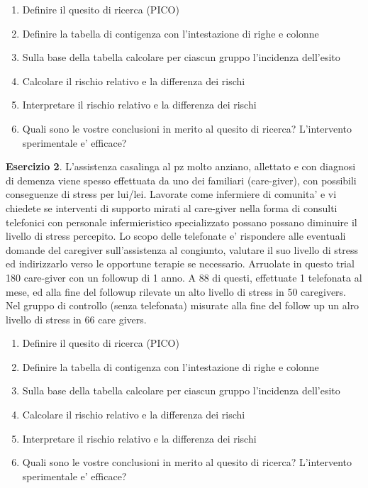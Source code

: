 \documentclass[]{book}
\begin{document}
\begin{enumerate}
\def\labelenumi{\arabic{enumi})}
\item
  Definire il quesito di ricerca (PICO)
\item
  Definire la tabella di contigenza con l'intestazione di righe e colonne
\item
  Sulla base della tabella calcolare per ciascun gruppo l'incidenza dell'esito
\item
  Calcolare il rischio relativo e la differenza dei rischi
\item
  Interpretare il rischio relativo e la differenza dei rischi
\item
  Quali sono le vostre conclusioni in merito al quesito di ricerca? L'intervento sperimentale e' efficace?
\end{enumerate}

\textbf{Esercizio 2}. L'assistenza casalinga al pz molto anziano, allettato e con diagnosi di demenza viene spesso effettuata da uno dei familiari (care-giver), con possibili conseguenze di stress per lui/lei. Lavorate come infermiere di comunita' e vi chiedete se interventi di supporto mirati al care-giver nella forma di consulti telefonici con personale infermieristico specializzato possano possano diminuire il livello di stress percepito. Lo scopo delle telefonate e' rispondere alle eventuali domande del caregiver sull'assistenza al congiunto, valutare il suo livello di stress ed indirizzarlo verso le opportune terapie se necessario. Arruolate in questo trial 180 care-giver con un followup di 1 anno. A 88 di questi, effettuate 1 telefonata al mese, ed alla fine del followup rilevate un alto livello di stress in 50 caregivers. Nel gruppo di controllo (senza telefonata) misurate alla fine del follow up un alro livello di stress in 66 care givers.

\begin{enumerate}
\def\labelenumi{\arabic{enumi})}
\item
  Definire il quesito di ricerca (PICO)
\item
  Definire la tabella di contigenza con l'intestazione di righe e colonne
\item
  Sulla base della tabella calcolare per ciascun gruppo l'incidenza dell'esito
\item
  Calcolare il rischio relativo e la differenza dei rischi
\item
  Interpretare il rischio relativo e la differenza dei rischi
\item
  Quali sono le vostre conclusioni in merito al quesito di ricerca? L'intervento sperimentale e' efficace?
\end{enumerate}
\end{document}
